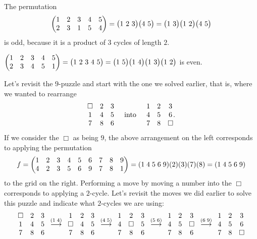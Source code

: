 \documentclass[11pt,dvipsnames]{book}
\numberwithin{equation}{section} %
\numberwithin{figure}{section} %
\numberwithin{table}{section} %
\begin{document}
\begin{example}  The permutation
$$
\left(\begin{matrix} %
1 & 2 & 3 & 4 & 5 \cr%
2 & 3 & 1 & 5 & 4 \cr%
\end{matrix}\right)=\big(1\ 2\ 3\big)\big(4\ 5\big)=\big(1\ 3\big)\big(1\ 2\big)\big(4\ 5\big)
$$
 is odd,  because it is a product of $3$ cycles of
length $2$.


$\left(\begin{matrix} %
1 & 2 & 3 & 4 & 5 \cr%
2 & 3 & 4 & 5 & 1 \cr%
\end{matrix}\right)=\big(1\ 2\ 3\ 4\ 5\big)=\big(1\ 5\big)\big(1\ 4\big)\big(1\ 3\big)\big(1\ 2\big)
$  is even.
\end{example}



\begin{example}
Let's revisit the $9$-puzzle and start with the one we solved earlier, that is, where we wanted to rearrange 
\[\begin{matrix} %
 \Box  & 2  & 3  \cr%
1 & 4& 5 \cr%
7 & 8 & 6 \cr%
\end{matrix} \;\;\;\; \mbox{ into } \;\;\;\; \begin{matrix} %
1 & 2  & 3  \cr%
4 & 5 & 6  \cr%
7 & 8 & \Box \cr%
\end{matrix}.\]
If we consider the $\Box$ as being $9$, the above arrangement on the left corresponds to applying the permutation 
\[
f=\left(\begin{matrix} %
1 & 2 & 3 & 4 & 5 & 6 & 7 & 8 & 9 \cr%
4 & 2 & 3 & 5 & 6 & 9 & 7 & 8 & 1\cr%
\end{matrix}\right)
=(1 \; 4 \; 5 \; 6 \; 9 )(2)(3)(7)(8)=(1 \; 4 \; 5 \; 6 \; 9 )
\]
to the grid on the right. Performing a move by moving a number into the $\Box$ corresponds to applying a $2$-cycle. Let's revisit the moves we did earlier to solve this puzzle and indicate what $2$-cycles we are using:
\[
\begin{matrix} %
 \Box  & 2  & 3  \cr%
1 & 4& 5 \cr%
7 & 8 & 6 \cr%
\end{matrix}
\;\;
\stackrel{(1 \; 4)}{\longrightarrow}
\;\;
\begin{matrix} %
1 & 2  & 3  \cr%
 \Box  & 4& 5 \cr%
7 & 8 & 6 \cr%
\end{matrix}
\;\;
\stackrel{(4 \; 5)}{\longrightarrow}
\;\;
\begin{matrix} %
1 & 2  & 3  \cr%
4 &  \Box  & 5 \cr%
7 & 8 & 6 \cr%
\end{matrix}
\;\;
\stackrel{(5 \; 6)}{\longrightarrow}
\;\;
\begin{matrix} %
1 & 2  & 3  \cr%
4 & 5 & \Box  \cr%
7 & 8 & 6 \cr%
\end{matrix}
\;\;
\stackrel{(6 \; 9)}{\longrightarrow}
\;\;
\begin{matrix} %
1 & 2  & 3  \cr%
4 & 5 & 6  \cr%
7 & 8 & \Box \cr%
\end{matrix}
\]


\end{example}
\end{document}
